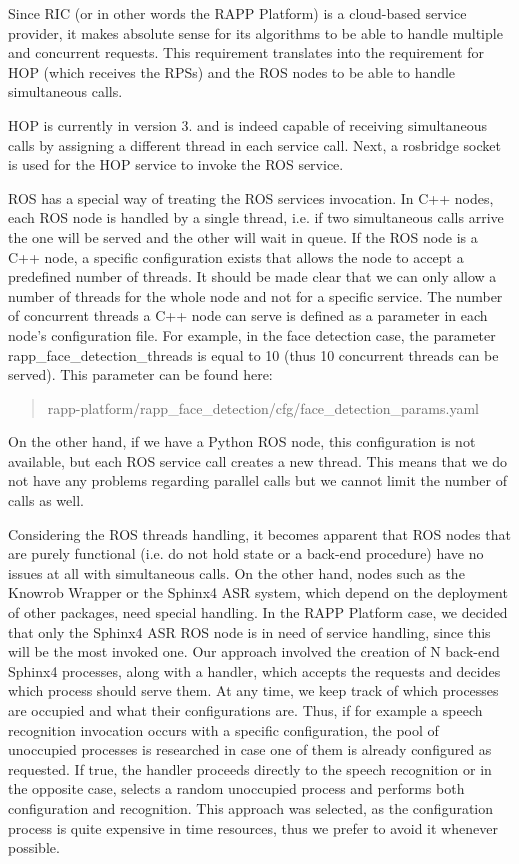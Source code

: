 Since R\-I\-C (or in other words the R\-A\-P\-P Platform) is a cloud-\/based service provider, it makes absolute sense for its algorithms to be able to handle multiple and concurrent requests. This requirement translates into the requirement for H\-O\-P (which receives the R\-P\-Ss) and the R\-O\-S nodes to be able to handle simultaneous calls.

H\-O\-P is currently in version 3. and is indeed capable of receiving simultaneous calls by assigning a different thread in each service call. Next, a rosbridge socket is used for the H\-O\-P service to invoke the R\-O\-S service.

R\-O\-S has a special way of treating the R\-O\-S services invocation. In C++ nodes, each R\-O\-S node is handled by a single thread, i.\-e. if two simultaneous calls arrive the one will be served and the other will wait in queue. If the R\-O\-S node is a C++ node, a specific configuration exists that allows the node to accept a predefined number of threads. It should be made clear that we can only allow a number of threads for the whole node and not for a specific service. The number of concurrent threads a C++ node can serve is defined as a parameter in each node's configuration file. For example, in the face detection case, the parameter {\ttfamily rapp\-\_\-face\-\_\-detection\-\_\-threads} is equal to 10 (thus 10 concurrent threads can be served). This parameter can be found here\-:

\begin{quotation}
rapp-\/platform/rapp\-\_\-face\-\_\-detection/cfg/face\-\_\-detection\-\_\-params.\-yaml

\end{quotation}


On the other hand, if we have a Python R\-O\-S node, this configuration is not available, but each R\-O\-S service call creates a new thread. This means that we do not have any problems regarding parallel calls but we cannot limit the number of calls as well.

Considering the R\-O\-S threads handling, it becomes apparent that R\-O\-S nodes that are purely functional (i.\-e. do not hold state or a back-\/end procedure) have no issues at all with simultaneous calls. On the other hand, nodes such as the Knowrob Wrapper or the Sphinx4 A\-S\-R system, which depend on the deployment of other packages, need special handling. In the R\-A\-P\-P Platform case, we decided that only the Sphinx4 A\-S\-R R\-O\-S node is in need of service handling, since this will be the most invoked one. Our approach involved the creation of N back-\/end Sphinx4 processes, along with a handler, which accepts the requests and decides which process should serve them. At any time, we keep track of which processes are occupied and what their configurations are. Thus, if for example a speech recognition invocation occurs with a specific configuration, the pool of unoccupied processes is researched in case one of them is already configured as requested. If true, the handler proceeds directly to the speech recognition or in the opposite case, selects a random unoccupied process and performs both configuration and recognition. This approach was selected, as the configuration process is quite expensive in time resources, thus we prefer to avoid it whenever possible. 